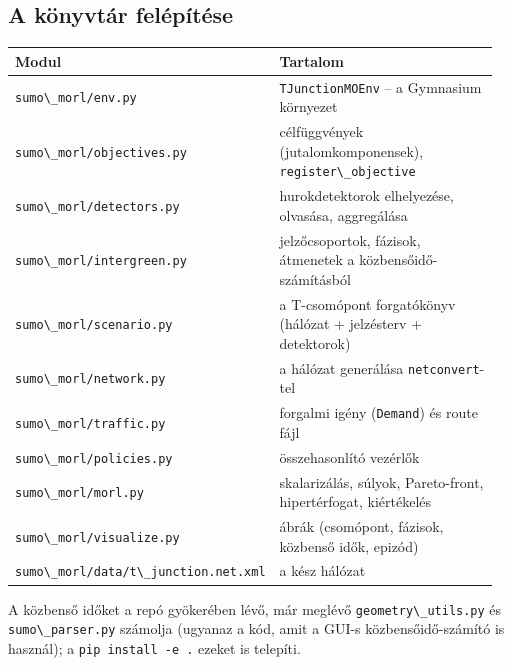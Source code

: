 \hypertarget{a-kuxf6nyvtuxe1r-feluxe9puxedtuxe9se}{%
\subsection{A könyvtár
felépítése}\label{a-kuxf6nyvtuxe1r-feluxe9puxedtuxe9se}}

\begin{longtable}[]{@{}>{\raggedright\arraybackslash}p{0.36\linewidth}>{\raggedright\arraybackslash}p{0.60\linewidth}@{}}
\toprule\noalign{}
Modul & Tartalom \\
\midrule\noalign{}
\endhead
\bottomrule\noalign{}
\endlastfoot
\passthrough{\lstinline!sumo\_morl/env.py!}
&
\passthrough{\lstinline!TJunctionMOEnv!}
-- a Gymnasium környezet \\
\passthrough{\lstinline!sumo\_morl/objectives.py!}
& célfüggvények (jutalomkomponensek),
\passthrough{\lstinline!register\_objective!} \\
\passthrough{\lstinline!sumo\_morl/detectors.py!}
& hurokdetektorok elhelyezése, olvasása,
aggregálása \\
\passthrough{\lstinline!sumo\_morl/intergreen.py!}
& jelzőcsoportok, fázisok, átmenetek a
közbensőidő-számításból \\
\passthrough{\lstinline!sumo\_morl/scenario.py!}
& a T-csomópont forgatókönyv (hálózat +
jelzésterv + detektorok) \\
\passthrough{\lstinline!sumo\_morl/network.py!}
& a hálózat generálása
\passthrough{\lstinline!netconvert!}-tel \\
\passthrough{\lstinline!sumo\_morl/traffic.py!}
& forgalmi igény
(\passthrough{\lstinline!Demand!}) és
route fájl \\
\passthrough{\lstinline!sumo\_morl/policies.py!}
& összehasonlító vezérlők \\
\passthrough{\lstinline!sumo\_morl/morl.py!}
& skalarizálás, súlyok, Pareto-front,
hipertérfogat, kiértékelés \\
\passthrough{\lstinline!sumo\_morl/visualize.py!}
& ábrák (csomópont, fázisok, közbenső
idők, epizód) \\
\passthrough{\lstinline!sumo\_morl/data/t\_junction.net.xml!}
& a kész hálózat \\
\end{longtable}

A közbenső időket a repó gyökerében
lévő, már meglévő
\passthrough{\lstinline!geometry\_utils.py!}
és
\passthrough{\lstinline!sumo\_parser.py!}
számolja (ugyanaz a kód, amit a GUI-s
közbensőidő-számító is használ); a
\passthrough{\lstinline!pip install -e .!}
ezeket is telepíti.


